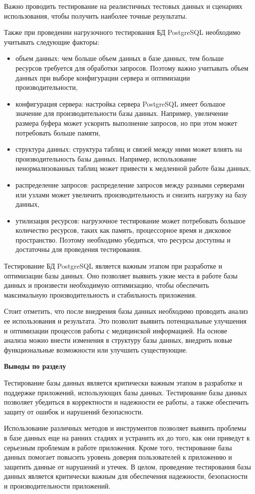Важно проводить тестирование на реалистичных тестовых данных и сценариях использования, чтобы получить наиболее точные результаты.

Также при проведении нагрузочного тестирования БД PostgreSQL необходимо учитывать следующие факторы:

\begin{itemize}
    \item объем данных: чем больше объем данных в базе данных, тем больше ресурсов требуется для обработки запросов. Поэтому важно учитывать объем данных при выборе конфигурации сервера и оптимизации производительности,
    \item конфигурация сервера: настройка сервера PostgreSQL имеет большое значение для производительности базы данных. Например, увеличение размера буфера может ускорить выполнение запросов, но при этом может потребовать больше памяти,
    \item структура данных: структура таблиц и связей между ними может влиять на производительность базы данных. Например, использование ненормализованных таблиц может привести к медленной работе базы данных,
    \item распределение запросов: распределение запросов между разными серверами или узлами может увеличить производительность и снизить нагрузку на базу данных,
    \item утилизация ресурсов: нагрузочное тестирование может потребовать большое количество ресурсов, таких как память, процессорное время и дисковое пространство. Поэтому необходимо убедиться, что ресурсы доступны и достаточны для проведения тестирования.
\end{itemize}

Тестирование БД PostgreSQL является важным этапом при разработке и оптимизации базы данных. Оно позволяет выявить узкие места в работе базы данных и произвести необходимую оптимизацию, чтобы обеспечить максимальную производительность и стабильность приложения.

Стоит отметить, что после внедрения базы данных необходимо проводить анализ ее использования и результата. Это позволит выявить потенциальные улучшения и оптимизации процессов работы с медицинской информацией. На основе анализа можно внести изменения в структуру базы данных, внедрить новые функциональные возможности или улучшить существующие.



\textbf{Выводы по разделу}

Тестирование базы данных является критически важным этапом в разработке и поддержке приложений, использующих базы данных. Тестирование базы данных позволяет убедиться в корректности и надежности ее работы, а также обеспечить защиту от ошибок и нарушений безопасности.

Использование различных методов и инструментов позволяет выявить проблемы в базе данных еще на ранних стадиях и устранить их до того, как они приведут к серьезным проблемам в работе приложения. Кроме того, тестирование базы данных помогает повысить уровень доверия пользователей к приложению и защитить данные от нарушений и утечек. В целом, проведение тестирования базы данных является критически важным для обеспечения надежности, безопасности и производительности приложений.
